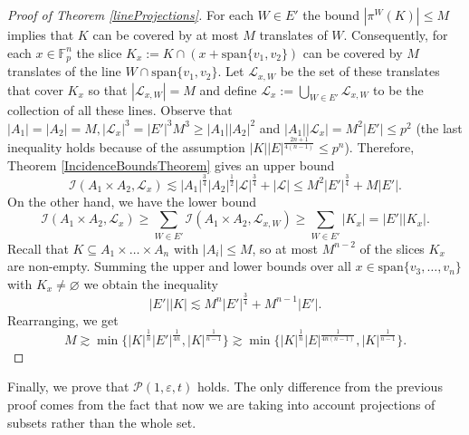 \documentclass{amsart}
\newcommand{\F}{\mathbb F}
\begin{document}
\begin{proof}[Proof of Theorem \ref{lineProjections}]
    For each $W \in E'$ the bound $|\pi^{W}(K)| \leq M$ implies that $K$ can be covered by at most $M$ translates of $W$. Consequently, for each $x \in \F_p^n$ the slice $K_x := K \cap (x + \text{span} \{v_1, v_2\})$ can be covered by $M$ translates of the line $W \cap \text{span}\{v_1, v_2\}$. Let $\mathcal{L}_{x, W}$ be the set of these translates that cover $K_x$ so that $|\mathcal{L}_{x, W}| = M$ and define $\mathcal{L}_x := \bigcup_{W \in E'} \mathcal{L}_{x, W}$ to be the collection of all these lines. Observe that $|A_1| = |A_2| = M, |\mathcal{L}_x|^3 = |E'|^3 M^3 \geq |A_1||A_2|^2$ and $|A_1||\mathcal{L}_x| = M^2|E'| \leq p^2$ (the last inequality holds because of the assumption $|K| |E|^\frac{2n + 1}{4(n - 1)} \leq p^n$). Therefore, Theorem \ref{IncidenceBoundsTheorem} gives an upper bound
    $$\mathcal{I}(A_1 \times A_2, \mathcal{L}_x) \lesssim |A_1|^\frac{3}{4}|A_2|^\frac{1}{2}|\mathcal{L}|^\frac{3}{4} + |\mathcal{L}| \leq  M^2 |E'|^\frac{3}{4} + M|E'|.$$
    On the other hand, we have the lower bound $$\mathcal{I}(A_1 \times A_2, \mathcal{L}_x) \geq \sum_{W \in E'} \mathcal{I}(A_1 \times A_2, \mathcal{L}_{x, W}) \geq \sum_{W \in E'} |K_x| = |E'||K_x|.$$
    Recall that $K \subseteq A_1 \times \ldots \times A_n$ with $|A_i| \leq M$, so at most $M^{n - 2}$ of the slices $K_x$ are non-empty. Summing the upper and lower bounds over all $x \in \text{span} \{v_3, \ldots, v_n\}$ with $K_x \neq \varnothing$ we obtain the inequality 
    $$|E'||K| \lesssim M^n |E'|^\frac{3}{4} + M^{n - 1}|E'|.$$
    Rearranging, we get 
    $$M \gtrsim \min\{|K|^\frac{1}{n}|E'|^\frac{1}{4n}, |K|^\frac{1}{n - 1}\} \gtrsim \min\{|K|^\frac{1}{n}|E|^\frac{1}{4n(n - 1)}, |K|^\frac{1}{n - 1}\}.$$
\end{proof}

Finally, we prove that $\mathcal{P}(1, \varepsilon, t)$ holds. The only difference from the previous proof comes from the fact that now we are taking into account projections of subsets rather than the whole set.
\end{document}
